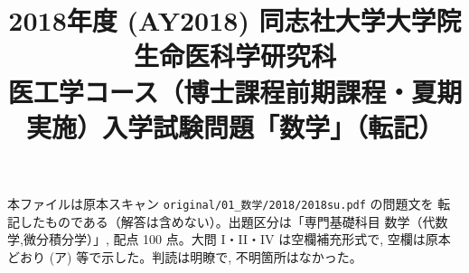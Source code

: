\documentclass[11pt,a4paper]{article}
\title{2018年度 (AY2018) 同志社大学大学院 生命医科学研究科\\
医工学コース（博士課程前期課程・夏期実施）入学試験問題「数学」（転記）}
\author{}
\date{}
\begin{document}
\maketitle
\vspace{-3em}

\begin{rem}
本ファイルは原本スキャン \texttt{original/01\_数学/2018/2018su.pdf} の問題文を
転記したものである（解答は含めない）。出題区分は「専門基礎科目 数学（代数学,微分積分学）」,
配点 100 点。大問 I・II・IV は空欄補充形式で, 空欄は原本どおり (ア) 等で示した。判読は明瞭で,
不明箇所はなかった。
\end{rem}

\bigskip

\bigskip

\bigskip

\bigskip

\end{document}
